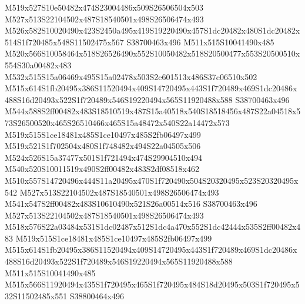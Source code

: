 \documentclass{article}
\begin{document}
\begin{multicols}{2}
M519x527S10e50482x474S23004486x509S26506504x503 M527x513S22104502x487S18540501x498S26506474x493 M526x582S10020490x423S2450a495x419S19220490x457S1dc20482x480S1dc20482x514S1f720485x548S11502475x567 S38700463x496 M511x515S10041490x485 M520x566S10058464x518S26526490x552S10050482x518S20500477x553S20500510x554S30a00482x483 M532x515S15a06469x495S15a02478x503S2c601513x486S37c06510x502 M515x614S1fb20495x386S11520494x409S14720495x443S1f720489x469S1dc20486x488S16d20493x522S1f720489x546S19220494x565S11920488x588 S38700463x496 M544x588S2ff00482x483S18510519x487S15a40518x540S18518456x487S22a04518x573S26500520x465S26510466x465S15a48472x540S22a14472x573 M519x515S1ce18481x485S1ce10497x485S2fb06497x499 M519x521S1f702504x480S1f748482x494S22a04505x506 M524x526S15a37477x501S1f721494x474S29904510x494 M540x520S10011519x490S2ff00482x483S2df08518x462 M510x557S14720496x444S11a20495x470S1f720490x504S20320495x523S20320495x542 M527x513S22104502x487S18540501x498S26506474x493 M541x547S2ff00482x483S10610490x521S26a00514x516 S38700463x496 M527x513S22104502x487S18540501x498S26506474x493 M518x576S22a03484x531S1dc02487x512S1dc4a470x552S1dc42444x535S2ff00482x483 M519x515S1ce18481x485S1ce10497x485S2fb06497x499 M515x614S1fb20495x386S11520494x409S14720495x443S1f720489x469S1dc20486x488S16d20493x522S1f720489x546S19220494x565S11920488x588 M511x515S10041490x485 M515x566S11920494x435S1f720495x465S1f720495x484S18d20495x503S1f720495x532S11502485x551 S38800464x496


\end{multicols}
\end{document}
